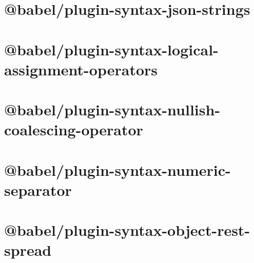 \documentclass[twoside]{book}
\newcommand{\+}{\discretionary{\mbox{\scriptsize$\hookleftarrow$}}{}{}}
\begin{document}
\chapter{@babel/plugin-\/syntax-\/json-\/strings}
\label{md__c___users_vaishnavi_jadhav__desktop__developer_code_mean_stack_example_client_node_modules__6f3b56c728a3fda18fa2170ed041a790}

\chapter{@babel/plugin-\/syntax-\/logical-\/assignment-\/operators}
\label{md__c___users_vaishnavi_jadhav__desktop__developer_code_mean_stack_example_client_node_modules__161d7c8912f5c13a73947f1c59fc23a0}

\chapter{@babel/plugin-\/syntax-\/nullish-\/coalescing-\/operator}
\label{md__c___users_vaishnavi_jadhav__desktop__developer_code_mean_stack_example_client_node_modules__96f37b866a2def204239f320b6c760e2}

\chapter{@babel/plugin-\/syntax-\/numeric-\/separator}
\label{md__c___users_vaishnavi_jadhav__desktop__developer_code_mean_stack_example_client_node_modules__74b07425defaca309553546c573fe3cf}

\chapter{@babel/plugin-\/syntax-\/object-\/rest-\/spread}
\label{md__c___users_vaishnavi_jadhav__desktop__developer_code_mean_stack_example_client_node_modules__289263c76c417cbd76c61cca9b324d7d}

\end{document}
